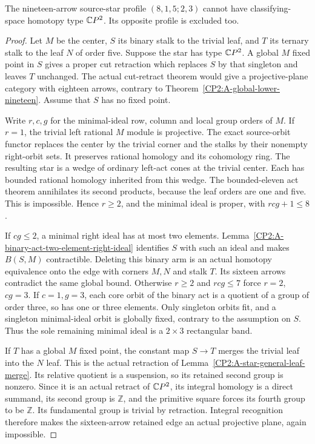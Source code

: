 \begin{theorem}
\label{CP2:A-star-eight-five-binary-ternary-nineteen}
The nineteen-arrow source-star profile $(8,1,5;2,3)$
cannot have classifying-space homotopy type $\mathbb{C}P^2$.
Its opposite profile is excluded too.
\end{theorem}
\begin{proof}
Let $M$ be the center, $S$ its binary stalk to the trivial
leaf, and $T$ its ternary stalk to the leaf $N$ of order
five. Suppose the star has type $\mathbb{C}P^2$.
A global $M$ fixed point in $S$ gives a proper cut
retraction which replaces $S$ by that singleton and
leaves $T$ unchanged. The actual cut-retract theorem
would give a projective-plane category with eighteen
arrows, contrary to Theorem~\ref{CP2:A-global-lower-nineteen}.
Assume that $S$ has no fixed point.

Write $r,c,g$ for the minimal-ideal row, column and local
group orders of $M$. If $r=1$, the trivial left rational
$M$ module is projective. The exact source-orbit functor
replaces the center by the trivial corner and the stalks
by their nonempty right-orbit sets. It preserves rational
homology and its cohomology ring. The resulting star is
a wedge of ordinary left-act cones at the trivial center.
Each has bounded rational homology inherited from this
wedge. The bounded-eleven act theorem annihilates its
second products, because the leaf orders are one and
five. This is impossible. Hence $r\geq2$, and the minimal
ideal is proper, with $rcg+1\leq8$.

If $cg\leq2$, a minimal right ideal has at most two
elements. Lemma~\ref{CP2:A-binary-act-two-element-right-ideal}
identifies $S$ with such an ideal and makes $B(S,M)$
contractible. Deleting this binary arm is an actual
homotopy equivalence onto the edge with corners $M,N$
and stalk $T$. Its sixteen arrows contradict the same
global bound. Otherwise $r\geq2$ and $rcg\leq7$ force
$r=2$, $cg=3$. If $c=1,g=3$, each core orbit of the
binary act is a quotient of a group of order three, so
has one or three elements. Only singleton orbits fit,
and a singleton minimal-ideal orbit is globally fixed,
contrary to the assumption on $S$. Thus the sole remaining
minimal ideal is a $2\times3$ rectangular band.

If $T$ has a global $M$ fixed point, the constant map
$S\to T$ merges the trivial leaf into the $N$ leaf.
This is the actual retraction of
Lemma~\ref{CP2:A-star-general-leaf-merge}. Its relative
quotient is a suspension, so its retained second group
is nonzero. Since it is an actual retract of $\mathbb{C}P^2$,
its integral homology is a direct summand, its second
group is $\mathbb Z$, and the primitive square forces
its fourth group to be $\mathbb Z$. Its fundamental
group is trivial by retraction. Integral recognition
therefore makes the sixteen-arrow retained edge an
actual projective plane, again impossible.


\end{proof}

